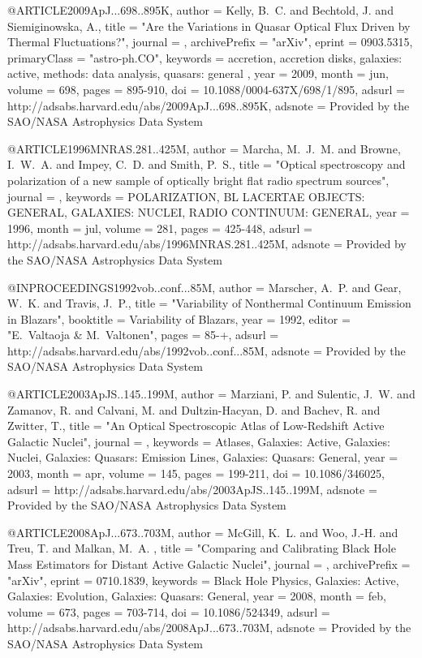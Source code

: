 \documentclass[twocolumn]{aastex62}
\begin{document}
{{{@ARTICLE{2009ApJ...698..895K,
   author = {{Kelly}, B.~C. and {Bechtold}, J. and {Siemiginowska}, A.},
    title = "{Are the Variations in Quasar Optical Flux Driven by Thermal Fluctuations?}",
  journal = {\apj},
archivePrefix = "arXiv",
   eprint = {0903.5315},
 primaryClass = "astro-ph.CO",
 keywords = {accretion, accretion disks, galaxies: active, methods: data analysis, quasars: general },
     year = 2009,
    month = jun,
   volume = 698,
    pages = {895-910},
      doi = {10.1088/0004-637X/698/1/895},
   adsurl = {http://adsabs.harvard.edu/abs/2009ApJ...698..895K},
  adsnote = {Provided by the SAO/NASA Astrophysics Data System}
}



@ARTICLE{1996MNRAS.281..425M,
   author = {{Marcha}, M.~J.~M. and {Browne}, I.~W.~A. and {Impey}, C.~D. and 
	{Smith}, P.~S.},
    title = "{Optical spectroscopy and polarization of a new sample of optically bright flat radio spectrum sources}",
  journal = {\mnras},
 keywords = {POLARIZATION, BL LACERTAE OBJECTS: GENERAL, GALAXIES: NUCLEI, RADIO CONTINUUM: GENERAL},
     year = 1996,
    month = jul,
   volume = 281,
    pages = {425-448},
   adsurl = {http://adsabs.harvard.edu/abs/1996MNRAS.281..425M},
  adsnote = {Provided by the SAO/NASA Astrophysics Data System}
}
	
@INPROCEEDINGS{1992vob..conf...85M,
   author = {{Marscher}, A.~P. and {Gear}, W.~K. and {Travis}, J.~P.},
    title = "{Variability of Nonthermal Continuum Emission in Blazars}",
booktitle = {Variability of Blazars},
     year = 1992,
   editor = "{E.~Valtaoja \& M.~Valtonen}",
    pages = {85-+},
   adsurl = {http://adsabs.harvard.edu/abs/1992vob..conf...85M},
  adsnote = {Provided by the SAO/NASA Astrophysics Data System}
}

@ARTICLE{2003ApJS..145..199M,
   author = {{Marziani}, P. and {Sulentic}, J.~W. and {Zamanov}, R. and {Calvani}, M. and 
	{Dultzin-Hacyan}, D. and {Bachev}, R. and {Zwitter}, T.},
    title = "{An Optical Spectroscopic Atlas of Low-Redshift Active Galactic Nuclei}",
  journal = {\apjs},
 keywords = {Atlases, Galaxies: Active, Galaxies: Nuclei, Galaxies: Quasars: Emission Lines, Galaxies: Quasars: General},
     year = 2003,
    month = apr,
   volume = 145,
    pages = {199-211},
      doi = {10.1086/346025},
   adsurl = {http://adsabs.harvard.edu/abs/2003ApJS..145..199M},
  adsnote = {Provided by the SAO/NASA Astrophysics Data System}
}



@ARTICLE{2008ApJ...673..703M,
   author = {{McGill}, K.~L. and {Woo}, J.-H. and {Treu}, T. and {Malkan}, M.~A.
	},
    title = "{Comparing and Calibrating Black Hole Mass Estimators for Distant Active Galactic Nuclei}",
  journal = {\apj},
archivePrefix = "arXiv",
   eprint = {0710.1839},
 keywords = {Black Hole Physics, Galaxies: Active, Galaxies: Evolution, Galaxies: Quasars: General},
     year = 2008,
    month = feb,
   volume = 673,
    pages = {703-714},
      doi = {10.1086/524349},
   adsurl = {http://adsabs.harvard.edu/abs/2008ApJ...673..703M},
  adsnote = {Provided by the SAO/NASA Astrophysics Data System}
}


}}}
\end{document}
